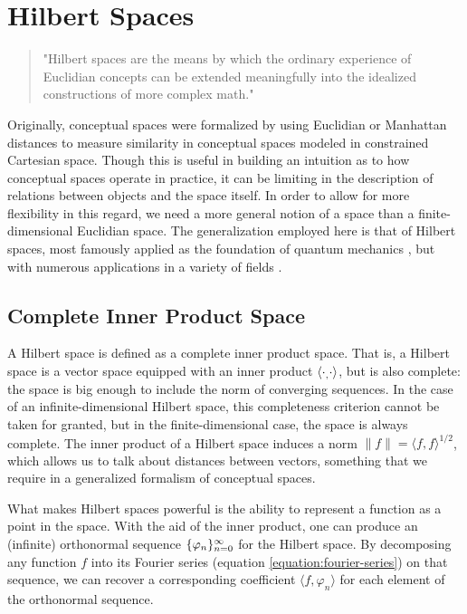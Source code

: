 \section{Hilbert Spaces}
\label{section:hilbert-spaces}

\begin{quote}
  "Hilbert spaces are the means by which the ordinary experience of Euclidian concepts can be extended meaningfully into the idealized constructions of more complex math." \cite{bernkopf2008schmidt}
\end{quote}

Originally, conceptual spaces \cite{gardenfors2004conceptual} were formalized by using Euclidian or Manhattan distances to measure similarity in conceptual spaces modeled in constrained Cartesian space. Though this is useful in building an intuition as to how conceptual spaces operate in practice, it can be limiting in the description of relations between objects and the space itself.  In order to allow for more flexibility in this regard, we need a more general notion of a space than a finite-dimensional Euclidian space.  The generalization employed here is that of Hilbert spaces, most famously applied as the foundation of quantum mechanics \cite{neumann1955mathematical}, but with numerous applications in a variety of fields \cite{kennedy2013hilbert}.

\subsection{Complete Inner Product Space} 
\label{subsection:complete-inner-product-space}

A Hilbert space is defined as a complete inner product space.  That is, a Hilbert space is a vector space equipped with an inner product $\langle\cdot _, \cdot\rangle$, but is also complete: the space is big enough to include the norm of converging sequences.  In the case of an infinite-dimensional Hilbert space, this completeness criterion cannot be taken for granted, but in the finite-dimensional case, the space is always complete.  The inner product of a Hilbert space induces a norm $\|f\| = \langle f, f \rangle^{1/2}$, which allows us to talk about distances between vectors, something that we require in a generalized formalism of conceptual spaces.

What makes Hilbert spaces powerful is the ability to represent a function as a point in the space.  With the aid of the inner product, one can produce an (infinite) orthonormal sequence $\{ \varphi_n \}_{n=0}^\infty$ for the Hilbert space.  By decomposing any function $f$ into its Fourier series (equation \ref{equation:fourier-series}) on that sequence, we can recover a corresponding coefficient $\langle f, \varphi_n \rangle$ for each element of the orthonormal sequence.

